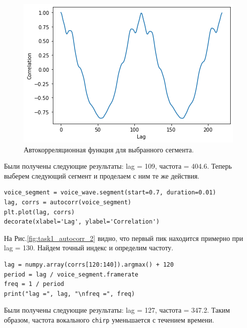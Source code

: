 \documentclass[a4paper, 14pt]{extarticle}
\begin{document}
    \begin{figure}[H]
        \centering
        \includegraphics[width=0.8\linewidth]{resources/Images/task1_autocorr_1}
        \caption{Автокорреляционная функция для выбранного сегмента.}
        \label{fig:task1_autocorr_1}
    \end{figure}

    Были получены следующие результаты: lag = 109, частота = 404.6.
    Теперь выберем следующий сегмент и проделаем с ним те же действия.

    \begin{lstlisting}[caption= Получение автокорреляционной функции второго сегмента., label={lst:task1_segment_2}]
voice_segment = voice_wave.segment(start=0.7, duration=0.01)
lag, corrs = autocorr(voice_segment)
plt.plot(lag, corrs)
decorate(xlabel='Lag', ylabel='Correlation')    \end{lstlisting}

    На Рис.\ref{fig:task1_autocorr_2} видно, что первый пик находится примерно при lag = 130.
    Найдем точный индекс и определим частоту.

    \begin{lstlisting}[caption= Поиск пика и вычисление его частоты., label={lst:task1_freq_2}]
lag = numpy.array(corrs[120:140]).argmax() + 120
period = lag / voice_segment.framerate
freq = 1 / period
print("lag =", lag, "\nfreq =", freq)   \end{lstlisting}

    Были получены следующие результаты: lag = 127, частота = 347.2.
    Таким образом, частота вокального \texttt{chirp} уменьшается с течением времени.
\end{document}

